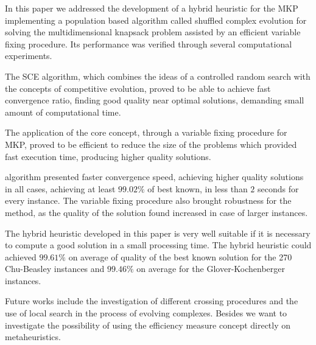 
In this paper we addressed the development of a hybrid heuristic for the MKP
implementing a population based algorithm called shuffled complex evolution
for solving the multidimensional knapsack problem assisted by an efficient
variable fixing procedure.
Its performance was verified through several computational experiments.

The SCE algorithm, which combines the ideas of a controlled random search with
the concepts of competitive evolution, proved to be able to achieve fast
convergence ratio, finding good quality near optimal solutions, demanding small
amount of computational time.

The application of the core concept, through a variable fixing procedure for MKP,
proved to be efficient to reduce the size of the problems which provided fast
execution time, producing higher quality solutions.

\scecore algorithm presented faster convergence speed, achieving higher
quality solutions in all cases, achieving at least $99.02\%$ of best known, in less than $2$ seconds
for every instance.
The variable fixing procedure also brought robustness for the method, as the quality
of the solution found increased in case of larger instances.

The hybrid heuristic developed in this paper is very well suitable if it is necessary
to compute a good solution in a small processing time.
The hybrid heuristic could achieved $99.61\%$ on average of quality of the best known solution for
the 270 Chu-Beasley instances and $99.46\%$ on average for the Glover-Kochenberger instances.

Future works include the investigation of different crossing procedures 
and the use of local search in the process of evolving complexes.
Besides we want to investigate the possibility of using the efficiency measure
concept directly on metaheuristics.

